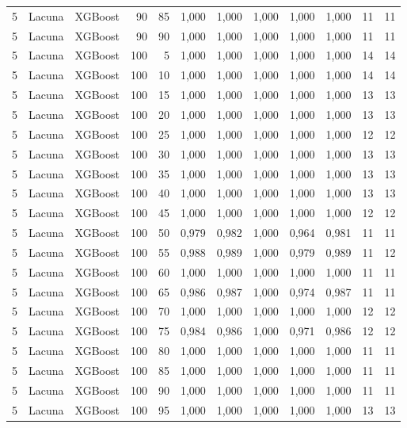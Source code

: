 \begin{longtable}{@{}rllrrrrrrrrr@{}}
5 & Lacuna & XGBoost & 90 & 85 & 1,000 & 1,000 & 1,000 & 1,000 & 1,000 & 11 & 11 \\
5 & Lacuna & XGBoost & 90 & 90 & 1,000 & 1,000 & 1,000 & 1,000 & 1,000 & 11 & 11 \\
5 & Lacuna & XGBoost & 100 & 5 & 1,000 & 1,000 & 1,000 & 1,000 & 1,000 & 14 & 14 \\
5 & Lacuna & XGBoost & 100 & 10 & 1,000 & 1,000 & 1,000 & 1,000 & 1,000 & 14 & 14 \\
5 & Lacuna & XGBoost & 100 & 15 & 1,000 & 1,000 & 1,000 & 1,000 & 1,000 & 13 & 13 \\
5 & Lacuna & XGBoost & 100 & 20 & 1,000 & 1,000 & 1,000 & 1,000 & 1,000 & 13 & 13 \\
5 & Lacuna & XGBoost & 100 & 25 & 1,000 & 1,000 & 1,000 & 1,000 & 1,000 & 12 & 12 \\
5 & Lacuna & XGBoost & 100 & 30 & 1,000 & 1,000 & 1,000 & 1,000 & 1,000 & 13 & 13 \\
5 & Lacuna & XGBoost & 100 & 35 & 1,000 & 1,000 & 1,000 & 1,000 & 1,000 & 13 & 13 \\
5 & Lacuna & XGBoost & 100 & 40 & 1,000 & 1,000 & 1,000 & 1,000 & 1,000 & 13 & 13 \\
5 & Lacuna & XGBoost & 100 & 45 & 1,000 & 1,000 & 1,000 & 1,000 & 1,000 & 12 & 12 \\
5 & Lacuna & XGBoost & 100 & 50 & 0,979 & 0,982 & 1,000 & 0,964 & 0,981 & 11 & 11 \\
5 & Lacuna & XGBoost & 100 & 55 & 0,988 & 0,989 & 1,000 & 0,979 & 0,989 & 11 & 12 \\
5 & Lacuna & XGBoost & 100 & 60 & 1,000 & 1,000 & 1,000 & 1,000 & 1,000 & 11 & 11 \\
5 & Lacuna & XGBoost & 100 & 65 & 0,986 & 0,987 & 1,000 & 0,974 & 0,987 & 11 & 11 \\
5 & Lacuna & XGBoost & 100 & 70 & 1,000 & 1,000 & 1,000 & 1,000 & 1,000 & 12 & 12 \\
5 & Lacuna & XGBoost & 100 & 75 & 0,984 & 0,986 & 1,000 & 0,971 & 0,986 & 12 & 12 \\
5 & Lacuna & XGBoost & 100 & 80 & 1,000 & 1,000 & 1,000 & 1,000 & 1,000 & 11 & 11 \\
5 & Lacuna & XGBoost & 100 & 85 & 1,000 & 1,000 & 1,000 & 1,000 & 1,000 & 11 & 11 \\
5 & Lacuna & XGBoost & 100 & 90 & 1,000 & 1,000 & 1,000 & 1,000 & 1,000 & 11 & 11 \\
5 & Lacuna & XGBoost & 100 & 95 & 1,000 & 1,000 & 1,000 & 1,000 & 1,000 & 13 & 13 \\

\end{longtable}
